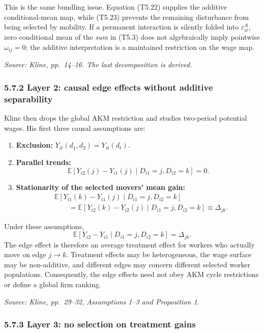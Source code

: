 \documentclass[11pt]{article}
\begin{document}
This is the same bundling issue.  Equation (T5.22) supplies the additive
conditional-mean map, while (T5.23) prevents the remaining disturbance from
being selected by mobility.  If a permanent interaction is silently folded
into \(\varepsilon^A_{it}\), zero conditional mean of the \emph{sum} in
(T5.3) does not algebraically imply pointwise
\(\omega_{ij}=0\); the additive interpretation is a maintained restriction
on the wage map.

\textit{Source: Kline, pp.\ 14--16.  The last decomposition is derived.}

\subsubsection{5.7.2 Layer 2: causal edge effects without additive
separability}

Kline then drops the global AKM restriction and studies two-period potential
wages.  His first three causal assumptions are:

\begin{enumerate}
\item \textbf{Exclusion:}
  \(Y_{it}(d_1,d_2)=Y_{it}(d_t)\).
\item \textbf{Parallel trends:}
  \[
  \mathbb E[
  Y_{i2}(j)-Y_{i1}(j)
  \mid
  D_{i1}=j,D_{i2}=k
  ]
  =0.
  \tag{T5.24}
  \]
\item \textbf{Stationarity of the selected movers' mean gain:}
  \[
  \begin{aligned}
  &\mathbb E[
  Y_{i1}(k)-Y_{i1}(j)
  \mid D_{i1}=j,D_{i2}=k]\\
  &\qquad =
  \mathbb E[
  Y_{i2}(k)-Y_{i2}(j)
  \mid D_{i1}=j,D_{i2}=k]
  \equiv\Delta_{jk}.
  \end{aligned}
  \tag{T5.25}
  \]
\end{enumerate}

Under these assumptions,
\[
\mathbb E[
Y_{i2}-Y_{i1}
\mid
D_{i1}=j,D_{i2}=k
]
=
\Delta_{jk}.
\tag{T5.26}
\]
The edge effect is therefore an average treatment effect for workers who
actually move on edge \(j\to k\).  Treatment effects may be heterogeneous,
the wage surface may be non-additive, and different edges may concern
different selected worker populations.  Consequently, the edge effects need
not obey AKM cycle restrictions or define a global firm ranking.

\textit{Source: Kline, pp.\ 29--32, Assumptions 1--3 and Proposition 1.}

\subsubsection{5.7.3 Layer 3: no selection on treatment gains}
\end{document}
